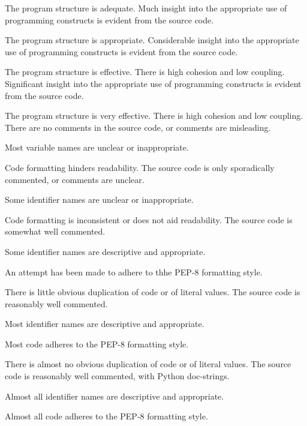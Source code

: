 \documentclass{../fal_assignment}
\begin{document}
\begin{markingrubric}
            \par The program structure is adequate.
        \grade Much insight into the appropriate use of programming constructs is evident from the source code.
            \par The program structure is appropriate.
        \grade Considerable insight into the appropriate use of programming constructs is evident from the source code.
            \par The program structure is effective. There is high cohesion and low coupling.
        \grade Significant insight into the appropriate use of programming constructs is evident from the source code.
            \par The program structure is very effective. There is high cohesion and low coupling.
%
        \grade\fail There are no comments in the source code, or comments are misleading.
            \par Most variable names are unclear or inappropriate.
            \par Code formatting hinders readability.
        \grade The source code is only sporadically commented, or comments are unclear.
            \par Some identifier names are unclear or inappropriate.
            \par Code formatting is inconsistent or does not aid readability.
        \grade The source code is somewhat well commented.
            \par Some identifier names are descriptive and appropriate.
            \par An attempt has been made to adhere to thhe PEP-8 formatting style.
             \par There is little obvious duplication of code or of literal values.           
        \grade The source code is reasonably well commented.
            \par Most identifier names are descriptive and appropriate.
            \par Most code adheres to the PEP-8 formatting style.
             \par There is almost no obvious duplication of code or of literal values.   
        \grade The source code is reasonably well commented, with Python doc-strings.
            \par Almost all identifier names are descriptive and appropriate.
            \par Almost all code adheres to the PEP-8 formatting style.

\end{markingrubric}
\end{document}
